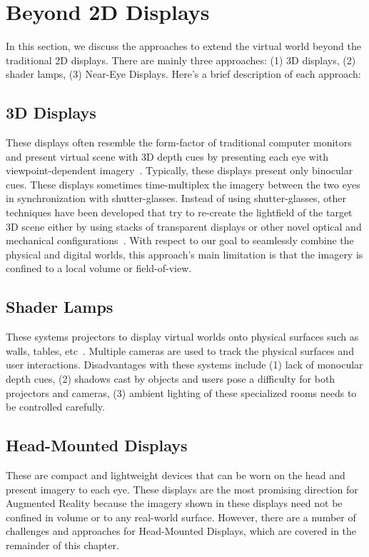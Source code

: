 \section{Beyond 2D Displays}
\label{sec:background:beyond_2d_displays}
In this section, we discuss the approaches to extend the virtual world beyond the traditional 2D displays. 
There are mainly three approaches: (1) 3D displays, (2) shader lamps, (3) Near-Eye Displays. 
Here’s a brief description of each approach:

\subsection{3D Displays}
\label{sec:background:3d_displays}
These displays often resemble the form-factor of traditional computer monitors and present virtual scene with 3D depth cues by presenting each eye with viewpoint-dependent imagery~\cite{geng2013three,holliman2011three}. 
Typically, these displays present only binocular cues. 
These displays sometimes time-multiplex the imagery between the two eyes in synchronization with shutter-glasses. 
Instead of using shutter-glasses, other techniques have been developed that try to re-create the lightfield of the target 3D scene either by using stacks of transparent displays or other novel optical and mechanical configurations~\cite{Wetzstein2012,Jones2007Rendering}. 
With respect to our goal to seamlessly combine the physical and digital worlds, this approach’s main limitation is that the imagery is confined to a local volume or field-of-view.

\subsection{Shader Lamps}
\label{sec:background:shader_lamps}
These systems projectors to display virtual worlds onto physical surfaces such as walls, tables, etc~\cite{Bimber:2008,raskar1998office,jones2013illumiroom}. 
Multiple cameras are used to track the physical surfaces and user interactions. 
Disadvantages with these systems include 
(1) lack of monocular depth cues, 
(2) shadows cast by objects and users pose a difficulty for both projectors and cameras, 
(3) ambient lighting of these specialized rooms needs to be controlled carefully.

\subsection{Head-Mounted Displays}
These are compact and lightweight devices that can be worn on the head and present imagery to each eye. 
These displays are the most promising direction for Augmented Reality because the imagery shown in these displays need not be confined in volume or to any real-world surface. 
However, there are a number of challenges and approaches for Head-Mounted Displays, which are covered in the remainder of this chapter.

